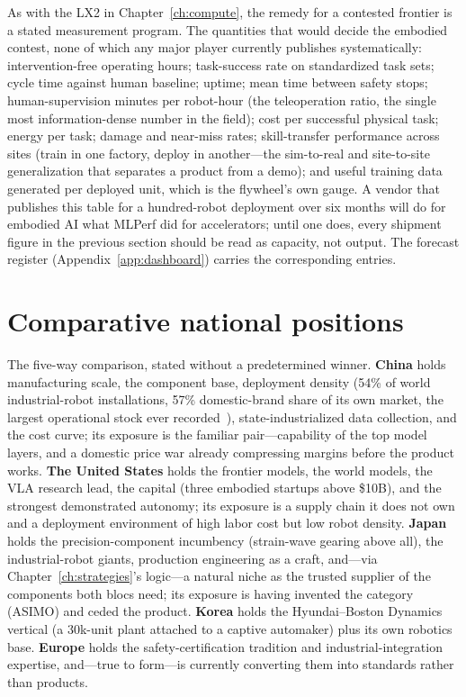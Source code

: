 As with the LX2 in Chapter~\ref{ch:compute}, the remedy for a contested frontier is a stated measurement program. The quantities that would decide the embodied contest, none of which any major player currently publishes systematically: intervention-free operating hours; task-success rate on standardized task sets; cycle time against human baseline; uptime; mean time between safety stops; human-supervision minutes per robot-hour (the teleoperation ratio, the single most information-dense number in the field); cost per successful physical task; energy per task; damage and near-miss rates; skill-transfer performance across sites (train in one factory, deploy in another---the sim-to-real and site-to-site generalization that separates a product from a demo); and useful training data generated per deployed unit, which is the flywheel's own gauge. A vendor that publishes this table for a hundred-robot deployment over six months will do for embodied AI what MLPerf did for accelerators; until one does, every shipment figure in the previous section should be read as capacity, not output. The forecast register (Appendix~\ref{app:dashboard}) carries the corresponding entries.

\section{Comparative national positions}
\label{sec:embodied-positions}

The five-way comparison, stated without a predetermined winner. \textbf{China} holds manufacturing scale, the component base, deployment density (54\% of world industrial-robot installations, 57\% domestic-brand share of its own market, the largest operational stock ever recorded~\cite{ifr}), state-industrialized data collection, and the cost curve; its exposure is the familiar pair---capability of the top model layers, and a domestic price war already compressing margins before the product works. \textbf{The United States} holds the frontier models, the world models, the VLA research lead, the capital (three embodied startups above \$10B), and the strongest demonstrated autonomy; its exposure is a supply chain it does not own and a deployment environment of high labor cost but low robot density. \textbf{Japan} holds the precision-component incumbency (strain-wave gearing above all), the industrial-robot giants, production engineering as a craft, and---via Chapter~\ref{ch:strategies}'s logic---a natural niche as the trusted supplier of the components both blocs need; its exposure is having invented the category (ASIMO) and ceded the product. \textbf{Korea} holds the Hyundai--Boston Dynamics vertical (a 30k-unit plant attached to a captive automaker) plus its own robotics base. \textbf{Europe} holds the safety-certification tradition and industrial-integration expertise, and---true to form---is currently converting them into standards rather than products.

